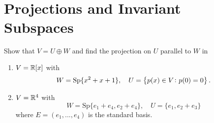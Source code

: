 \documentclass[11pt, a4paper]{article}
\begin{document}
\maketitle
\newpage
\tableofcontents
\newpage

\section{Projections and Invariant Subspaces}

\begin{exercise}
Show that $V = U \oplus W$ and find the projection on $U$ parallel to $W$ in
\begin{enumerate}
  \item[(1)] $V = \mathbb{R}[x]$ with 
    \[
      W = \text{Sp}\{x^2+x+1\}, \quad U = \left\{p(x) \in V \colon p(0) = 0\right\}.
    \]
  \item[(2)] $V = \mathbb{R}^4$ with 
    \[
      W = \text{Sp}\{e_1+e_4,e_2+e_4\},\quad U = \{e_1,e_2+e_3\}
    \]
    where $E = (e_1,...,e_4)$ is the standard basis.
\end{enumerate}
\end{exercise}
\end{document}
